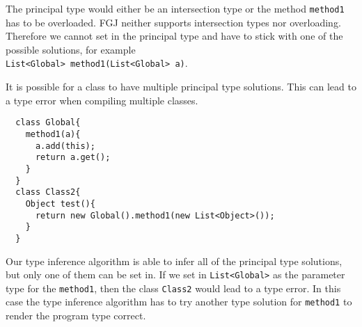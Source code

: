 The principal type would either be an intersection type or the method \texttt{method1} has to be overloaded.
FGJ neither supports intersection types nor overloading.
Therefore we cannot set in the principal type and have to stick with one of the possible solutions,
for example\\
\texttt{List<Global> method1(List<Global> a)}.

It is possible for a class to have multiple principal type solutions.
This can lead to a type error when compiling multiple classes.
\begin{lstlisting}
  class Global{
    method1(a){
      a.add(this);
      return a.get();
    }
  }
  class Class2{
    Object test(){
      return new Global().method1(new List<Object>());
    }
  }
\end{lstlisting}
Our type inference algorithm is able to infer all of the principal type solutions, but only one of them can be set in.
If we set in \texttt{List<Global>} as the parameter type for the \texttt{method1},
then the class \texttt{Class2} would lead to a type error.
In this case the type inference algorithm has to try another type solution for \texttt{method1}
to render the program type correct.

